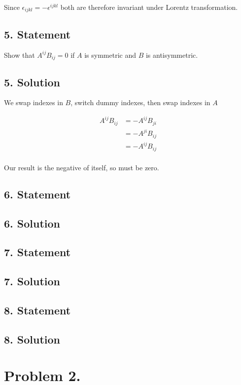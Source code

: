 Since $\epsilon_{i j k l} = -\epsilon^{i j k l}$ both are therefore invariant under Lorentz transformation.

\subsection{5. Statement}

Show that $A^{ij} B_{ij} = 0$ if $A$ is symmetric and $B$ is antisymmetric.

\subsection{5. Solution}

We swap indexes in $B$, switch dummy indexes, then swap indexes in $A$

\begin{align*}
A^{i j} B_{i j} 
&= 
-A^{i j} B_{j i} \\
&= 
-A^{j i} B_{i j} \\
&= 
-A^{i j} B_{i j} \\
\end{align*}

Our result is the negative of itself, so must be zero.

\subsection{6. Statement}
\subsection{6. Solution}
\subsection{7. Statement}
\subsection{7. Solution}
\subsection{8. Statement}
\subsection{8. Solution}

\section{Problem 2.}
